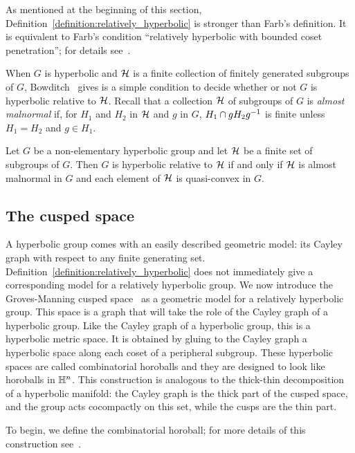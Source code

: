 As mentioned at the beginning of this section, Definition~\ref{definition:relatively_hyperbolic} is stronger than Farb's definition. 
It is equivalent to Farb's condition ``relatively hyperbolic with bounded coset penetration''; for details see~\cite{bowditch98b}.

When $G$ is hyperbolic and $\mathcal{H}$ is a finite collection of finitely generated subgroups of $G$, Bowditch~\cite{bowditch12} gives is a simple condition to decide whether or not $G$ is hyperbolic relative to $\mathcal{H}$.
Recall that a collection $\mathcal{H}$ of subgroups of $G$ is \emph{almost malnormal} if, for $H_1$ and $H_2$ in $\mathcal{H}$ and $g$ in $G$, $H_1 \cap gH_2g^{-1}$ is finite unless $H_1 = H_2$ and $g \in H_1$.

\begin{theorem}\label{theorem:quasiconvex_almost_malnormal}\cite[Theorem 7.11]{bowditch12} 
  Let $G$ be a non-elementary hyperbolic group and let $\mathcal{H}$ be a finite set of subgroups of $G$. 
  Then $G$ is hyperbolic relative to $\mathcal{H}$ if and only if $\mathcal{H}$ is almost malnormal in $G$ and each element of $\mathcal{H}$ is quasi-convex in $G$.
\end{theorem}

\subsection{The cusped space}

A hyperbolic group comes with an easily described geometric model: its Cayley graph with respect to any finite generating set. 
Definition~\ref{definition:relatively_hyperbolic} does not immediately give a corresponding model for a relatively hyperbolic group.
We now introduce the Groves-Manning cusped space~\cite{grovesmanning08} as a geometric model for a relatively hyperbolic group.
This space is a graph that will take the role of the Cayley graph of a hyperbolic group.
Like the Cayley graph of a hyperbolic group, this is a hyperbolic metric space.
It is obtained by gluing to the Cayley graph a hyperbolic space along each coset of a peripheral subgroup.
These hyperbolic spaces are called combinatorial horoballs and they are designed to look like horoballs in $\mathbb{H}^n$.
This construction is analogous to the thick-thin decomposition of a hyperbolic manifold: the Cayley graph is the thick part of the cusped space, and the group acts cocompactly on this set, while the cusps are the thin part.

To begin, we define the combinatorial horoball; for more details of this construction see~\cite{grovesmanning08}.

